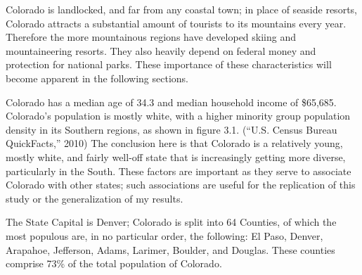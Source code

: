 \documentclass[12pt,twoside]{reedthesis}
\begin{document}
  Colorado is landlocked, and far from any coastal town; in place of
  seaside resorts, Colorado attracts a substantial amount of tourists to
  its mountains every year. Therefore the more mountainous regions have
  developed skiing and mountaineering resorts. They also heavily depend on
  federal money and protection for national parks. These importance of
  these characteristics will become apparent in the following sections.
  
  Colorado has a median age of 34.3 and median household income of
  \$65,685. Colorado's population is mostly white, with a higher minority
  group population density in its Southern regions, as shown in figure
  3.1. (``U.S. Census Bureau QuickFacts,'' 2010) The conclusion here is
  that Colorado is a relatively young, mostly white, and fairly well-off
  state that is increasingly getting more diverse, particularly in the
  South. These factors are important as they serve to associate Colorado
  with other states; such associations are useful for the replication of
  this study or the generalization of my results.
  
  The State Capital is Denver; Colorado is split into 64 Counties, of
  which the most populous are, in no particular order, the following: El
  Paso, Denver, Arapahoe, Jefferson, Adams, Larimer, Boulder, and Douglas.
  These counties comprise 73\% of the total population of Colorado.
  
\end{document}
